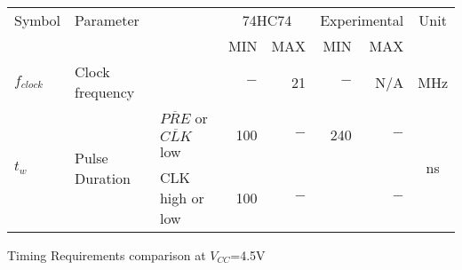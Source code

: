 \begin{tabular}{|l|l|l|r|r|r|r|c|}
    \toprule
    Symbol  &\multicolumn{2}{|l|}{Parameter}&\multicolumn{2}{|c|}{74HC74}&\multicolumn{2}{|c|}{Experimental}&Unit\\
            &\multicolumn{2}{c|}{ }&MIN&MAX&MIN&MAX&\\
    \midrule
    $f_{clock}$&Clock frequency&    &$-$&21&$-$&N/A&MHz\\
    \hline
    \multirow{2}{*}{$t_{w}$}&\multirow{2}{*}{Pulse Duration}& $\overline{PRE}$ or $\overline{CLK}$ low&100&$-$&240&$-$  &\multirow{2}{*}{ns}\\
        &&CLK high or low&100&$-$&  &$-$  &\\
    \bottomrule
\end{tabular}
\caption{Timing Requirements comparison at $V_{CC}$=4.5V}
